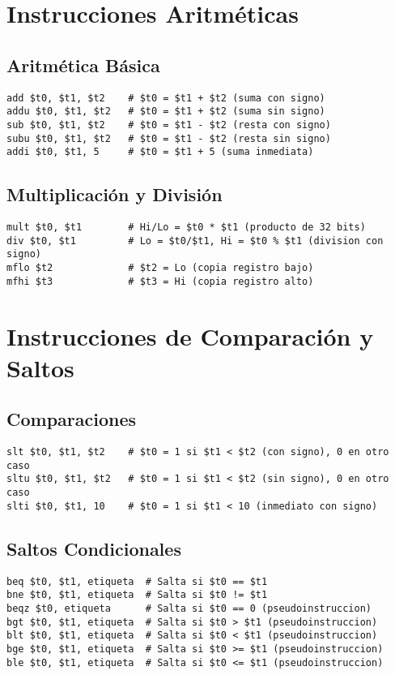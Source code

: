 \documentclass{article}
\begin{document}
\section{Instrucciones Aritméticas}

\subsection{Aritmética Básica}
\begin{lstlisting}[language={[mips]Assembler}]
add $t0, $t1, $t2    # $t0 = $t1 + $t2 (suma con signo)
addu $t0, $t1, $t2   # $t0 = $t1 + $t2 (suma sin signo)
sub $t0, $t1, $t2    # $t0 = $t1 - $t2 (resta con signo)
subu $t0, $t1, $t2   # $t0 = $t1 - $t2 (resta sin signo)
addi $t0, $t1, 5     # $t0 = $t1 + 5 (suma inmediata)
\end{lstlisting}

\subsection{Multiplicación y División}
\begin{lstlisting}[language={[mips]Assembler}]
mult $t0, $t1        # Hi/Lo = $t0 * $t1 (producto de 32 bits)
div $t0, $t1         # Lo = $t0/$t1, Hi = $t0 % $t1 (division con signo)
mflo $t2             # $t2 = Lo (copia registro bajo)
mfhi $t3             # $t3 = Hi (copia registro alto)
\end{lstlisting}

\section{Instrucciones de Comparación y Saltos}

\subsection{Comparaciones}
\begin{lstlisting}[language={[mips]Assembler}]
slt $t0, $t1, $t2    # $t0 = 1 si $t1 < $t2 (con signo), 0 en otro caso
sltu $t0, $t1, $t2   # $t0 = 1 si $t1 < $t2 (sin signo), 0 en otro caso
slti $t0, $t1, 10    # $t0 = 1 si $t1 < 10 (inmediato con signo)
\end{lstlisting}

\subsection{Saltos Condicionales}
\begin{lstlisting}[language={[mips]Assembler}]
beq $t0, $t1, etiqueta  # Salta si $t0 == $t1
bne $t0, $t1, etiqueta  # Salta si $t0 != $t1
beqz $t0, etiqueta      # Salta si $t0 == 0 (pseudoinstruccion)
bgt $t0, $t1, etiqueta  # Salta si $t0 > $t1 (pseudoinstruccion)
blt $t0, $t1, etiqueta  # Salta si $t0 < $t1 (pseudoinstruccion)
bge $t0, $t1, etiqueta  # Salta si $t0 >= $t1 (pseudoinstruccion)
ble $t0, $t1, etiqueta  # Salta si $t0 <= $t1 (pseudoinstruccion)
\end{lstlisting}
\end{document}

